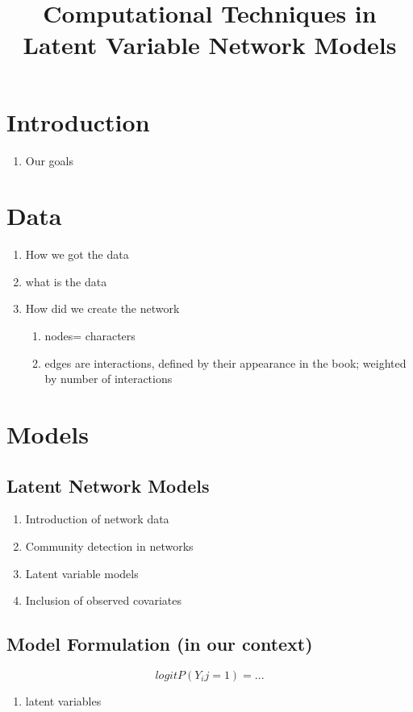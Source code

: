\documentclass{article}
\title{Computational Techniques in Latent Variable Network Models}
\begin{document}
\maketitle

\section{Introduction}
\begin{enumerate}
	\item Our goals 
\end{enumerate}

\section{Data}
\begin{enumerate}
	\item How we got the data
	\item what is the data
	\item How did we create the network  
	\begin{enumerate}
		\item nodes= characters
		\item edges are interactions, defined by their appearance in the book; weighted by number of interactions
	\end{enumerate}
\end{enumerate}

\section{Models}
\subsection{Latent Network Models}
\begin{enumerate}
    \item Introduction of network data
    \item Community detection in networks
    \item Latent variable models 
    \item Inclusion of observed covariates
\end{enumerate}

\subsection{Model Formulation (in our context)}
$$logit P(Y_ij = 1) = ... $$
\begin{enumerate}
	\item latent variables 
\end{enumerate}
\end{document}
